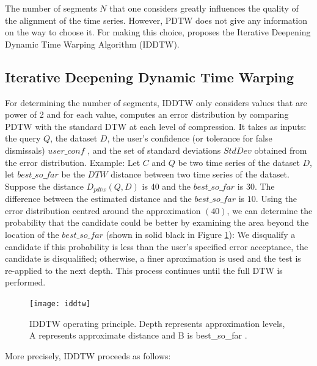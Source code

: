 The number  of segments $N$ that one considers greatly influences the quality of the alignment of the time series. However, PDTW does not give any information on the way to choose it. For making this choice, \cite{chu2002iterative} proposes the Iterative Deepening Dynamic Time Warping Algorithm (IDDTW).



\subsection{Iterative Deepening Dynamic Time Warping}
\label{sec:2}

For determining the number of segments, IDDTW only considers values that are  power of 2 and for each value, computes an error distribution by comparing PDTW with the standard DTW at each level of compression. It takes as inputs: the query $Q$, the dataset $D$, the user's confidence (or tolerance for false dismissals) $user\_conf$ , and the set of standard deviations $StdDev$ obtained from the error distribution. Example: Let $C$ and $Q$ be two time series of the dataset $D$, let $best\_so\_far$ be the $DTW$ distance between two time series of the dataset. Suppose the distance $D_{pdtw}(Q, D)$ is 40 and the $best\_so\_far$ is $30$. The difference between the estimated distance and the $best\_so\_far$ is $10$. Using the error distribution centred around the approximation $(40)$, we can determine the probability that the candidate could be better by examining the area beyond the location of the $best\_so\_far$ (shown in solid black in
Figure \ref{iddtwPrinciple}): We disqualify a candidate if this probability is less than the user's specified error acceptance, the candidate is disqualified; otherwise, a finer aproximation is used and the test is re-applied to the next depth. This process continues until the full DTW is performed.


\begin{figure}
\center
\texttt{[image: iddtw]}
\caption{IDDTW operating principle. Depth represents approximation levels, A represents approximate distance and B is best\_so\_far \cite{chu2002iterative}. }

\label{iddtwPrinciple}

\end{figure}

More precisely, IDDTW proceeds as follows: 

